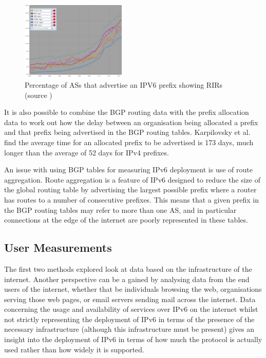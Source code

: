\begin{figure}[htb]
\centering
\includegraphics[width=0.45\textwidth]{img/v6-bgp-rirs.png}
\caption{Percentage of ASs that advertise an IPV6 prefix showing RIRs (source
\protect\cite{ripe_ncc_ipv6_2013})}
\label{fig:bgp-rirs}
\end{figure}

It is also possible to combine the BGP routing data with the prefix allocation
data to work out how the delay between an organisation being allocated a prefix
and that prefix being advertised in the BGP routing tables. Karpilovsky et al.
find the average time for an allocated prefix to be advertised is 173 days, much
longer than the average of 52 days for IPv4 prefixes\cite{karpilovsky_quantifying_2009}.

An issue with using BGP tables for measuring IPv6 deployment is use of route
aggregation. Route aggregation is a feature of IPv6 designed to reduce the size of the
global routing table by advertising the largest possible prefix where a router
has routes to a number of consecutive prefixes. This means that a given prefix in
the BGP routing tables may refer to more than one AS, and in particular
connections at the edge of the internet are poorly represented in these
tables\cite{dhamdhere_measuring_2012}.


\subsection{User Measurements}

The first two methods explored look at data based on the
infrastructure of the internet. Another perspective can be a gained by analysing
data from the end users of the internet, whether that be individuals browsing
the web, organisations serving those web pages, or email servers sending mail
across the internet. Data concerning the usage and availability of services over
IPv6 on the internet whilst not strictly representing the deployment of IPv6 in
terms of the presence of the necessary infrastructure (although this
infrastructure must be
present) gives an insight into the deployment of IPv6 in terms of
how much the protocol is actually used rather than how widely it is supported.

